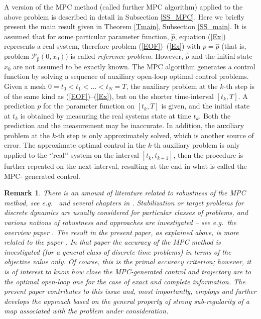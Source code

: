 \documentclass[11pt]{article}
\newtheorem{rem}[theo]{Remark}
\begin{document}
A version of the MPC method (called further MPC algorithm) applied to the above problem  
is described in detail in Subsection \ref{SS_MPC}. Here we briefly present the main result given in Theorem \ref{Tmain},
Subsection \ref{SS_main}. 
It is assumed that for some particular parameter function, $\hat p$, equation (\ref{Ex}) represents 
a real system, therefore problem (\ref{EOF})--(\ref{Ex}) with $p = \hat p$ (that is, problem $\mathcal P_{\hat p}(0,x_0)$)
is called {\em reference problem}. However, $\hat p$ and the initial state $x_0$ are not assumed to be exactly known.
The MPC algorithm generates a control function by solving a sequence of auxiliary open-loop optimal control problems.
Given a mesh $0 = t_0 < t_1 < \ldots < t_N = T$, the auxiliary problem at the $k$-th step is of the same kind as 
(\ref{EOF})--(\ref{Ex}), but on the shorter time-interval $[t_k, T]$.
A prediction $p$ for the parameter function on $[t_k,T]$ is given, 
and the initial state at $t_k$ is obtained by measuring the real systems state at time $t_k$. 
Both the prediction and the measurement 
may be inaccurate. In addition, the auxiliary problem at the $k$-th step
is only approximately solved, which is another source of error. The approximate optimal control in the $k$-th auxiliary problem
is only applied to the `'real'' system on the interval $[t_k, t_{k+1}]$, then the procedure is further repeated
on the next interval, resulting at the end  in what is called the MPC- generated control.
\begin{rem}
There is an amount of literature related to robustness of the MPC method, see e.g.\ \cite{Langson+Chryssochoos+Rakovic+Mayne-2004,Grimm+Messina+Tuna+Teel-2007}
and several chapters in \cite{MPOC_HB-18}. Stabilization or target problems for discrete dynamics are usually 
considered for particular classes of problems, and various notions of robustness and approaches 
are investigated – see e.g.\ the overview paper \cite[Chapter by Rakovi\'c]{Baillieul+Samad-2020}. The result in the 
present paper, as explained above, is more related to the paper \cite{Grune+Palma-2014}. In that paper the accuracy 
of the MPC method is investigated (for a general class of discrete-time problems) in terms of the 
objective value only. Of course, this is the primal accuracy criterion; however, it is of interest to know 
how close the MPC-generated control and trajectory are to the optimal open-loop one for the case 
of exact and complete information. The present paper contributes to this issue and, most 
importantly, employs and further develops the approach based on the general property of strong 
sub-regularity of a map associated with the problem under consideration.
\end{rem}
\end{document}
